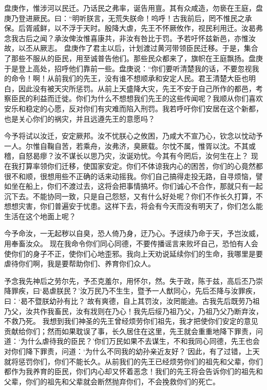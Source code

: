 \documentclass[a4paper,12pt,UTF8,twoside]{ctexbook}
\begin{document}
盘庚作，惟涉河以民迁。乃话民之弗率，诞告用亶。其有众咸造，勿亵在王庭，盘庚乃登进厥民。曰：“明听朕言，无荒失朕命！呜呼！古我前后，罔不惟民之承保。后胥戚鲜，以不浮于天时。殷降大虐，先王不怀厥攸作，视民利用迁。汝曷弗念我古后之闻？承汝俾汝惟喜康共，非汝有咎比于罚。予若吁怀兹新邑，亦惟汝故，以丕从厥志。
盘庚作了君主以后，计划渡过黄河带领臣民迁移。于是，集合了那些不服从的臣民，用至诚普告他们。那些民众都来了，旗帜在王庭飘扬。盘庚于是登上高处，招呼他们靠前一些。盘庚说：“你们要听清楚我的话，不要忽视我的命令！啊！从前我们的先王，没有谁不想顺承和安定人民。君王清楚大臣也明白，因此没有被天灾所惩罚。从前上天盛降大灾，先王不安于自己所作的都邑，考察臣民的利益而迁徙。你们为什么不想想我们先王的这些传闻呢？我顺从你们喜欢安乐和稳定的心愿，反对你们有灾难而陷入刑罚。我若呼吁你们安居在这个新都，也是关心你们的祸灾，并且远遵先王的意愿吗？

今予将试以汝迁，安定厥邦。汝不忧朕心之攸困，乃咸大不宣乃心，钦念以忱动予一人。尔惟自鞠自苦，若乘舟，汝弗济，臭厥载。尔忱不属，惟胥以沈。不其或稽，自怒曷瘳？汝不谋长以思乃灾，汝诞劝忧。今其有今罔后，汝何生在上？
现在我打算率领你们迁移，使国家安定。你们不体谅我内心的困苦，你们的心竟然都很不和顺，很想用些不正确的话来动摇我。你们自己搞得走投无路，自寻烦恼，譬如坐在船上，你们不渡过去，这将会把事情搞坏。你们诚心不合作，那就只有一起沉下去。不能协同一致，只是自己怨怒，又有什么好处呢？你们不作长久打算，不想想灾害，你们普遍安于忧患。这样下去，将会有今天而没有明天了，你们怎么能生活在这个地面上呢？

今予命汝，一无起秽以自臭，恐人倚乃身，迂乃心。予迓续乃命于天，予岂汝威，用奉畜汝众。
现在我命令你们同心同德，不要传播谣言来败坏自己，恐怕有人会使你们的身子不正，使你们心地歪邪。我向上天劝说延续你们的生命，我哪里是要虐待你们啊，我是要帮助你们、养育你们众人。

予念我先神后之劳尔先，予丕克羞尔，用怀尔，然。失于政，陈于兹，高后丕乃崇降罪疾，曰‘曷虐朕民？’汝万民乃不生生，暨予一人猷同心，先后丕降与汝罪疾，曰：‘曷不暨朕幼孙有比？’故有爽德，自上其罚汝，汝罔能迪。古我先后既劳乃祖乃父，汝共作我畜民，汝有戕则在乃心！我先后绥乃祖乃父，乃祖乃父乃断弃汝，不救乃死。
我想到我们神圣的先王曾经烦劳你们祖先，我才把使你们安定的意见贡献给你们；然而如果耽误了事，长久居住在这里，先王就会重重地降下罪责，问道：‘为什么虐待我的臣民？’你们万民如果不去谋生，不和我同心同德，先王也会对你们降下罪责，问道：‘为什么不同我的幼孙亲近友好？’因此，有了过错，上天就将惩罚你们，你们不能长久。从前我们的先王已经烦劳你们的祖先和父辈，你们都作为我养育的臣民，你们内心却又怀着恶念！我们的先王将会告诉你们的祖先和父辈，你们的祖先和父辈就会断然抛弃你们，不会挽救你们的死亡。
\end{document}
